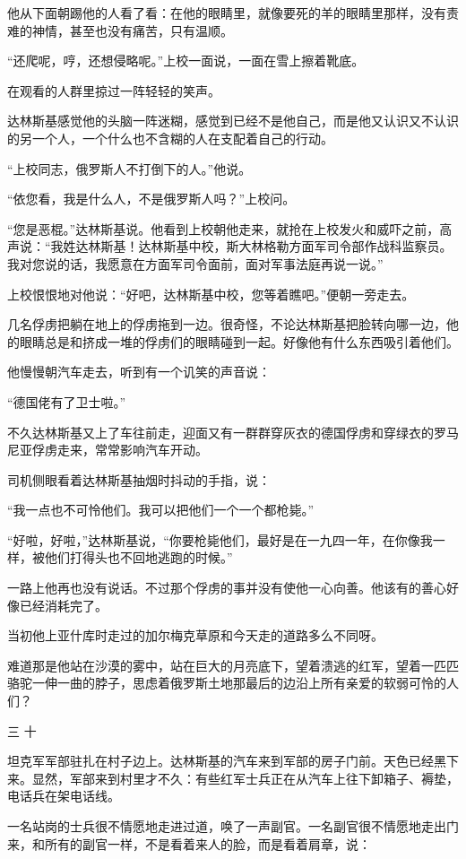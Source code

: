 他从下面朝踢他的人看了看：在他的眼睛里，就像要死的羊的眼睛里那样，没有责难的神情，甚至也没有痛苦，只有温顺。

“还爬呢，哼，还想侵略呢。”上校一面说，一面在雪上擦着靴底。

在观看的人群里掠过一阵轻轻的笑声。

达林斯基感觉他的头脑一阵迷糊，感觉到已经不是他自己，而是他又认识又不认识的另一个人，一个什么也不含糊的人在支配着自己的行动。

“上校同志，俄罗斯人不打倒下的人。”他说。

“依您看，我是什么人，不是俄罗斯人吗？”上校问。

“您是恶棍。”达林斯基说。他看到上校朝他走来，就抢在上校发火和威吓之前，高声说：“我姓达林斯基！达林斯基中校，斯大林格勒方面军司令部作战科监察员。我对您说的话，我愿意在方面军司令面前，面对军事法庭再说一说。”

上校恨恨地对他说：“好吧，达林斯基中校，您等着瞧吧。”便朝一旁走去。

几名俘虏把躺在地上的俘虏拖到一边。很奇怪，不论达林斯基把脸转向哪一边，他的眼睛总是和挤成一堆的俘虏们的眼睛碰到一起。好像他有什么东西吸引着他们。

他慢慢朝汽车走去，听到有一个讥笑的声音说：

“德国佬有了卫士啦。”

不久达林斯基又上了车往前走，迎面又有一群群穿灰衣的德国俘虏和穿绿衣的罗马尼亚俘虏走来，常常影响汽车开动。

司机侧眼看着达林斯基抽烟时抖动的手指，说：

“我一点也不可怜他们。我可以把他们一个一个都枪毙。”

“好啦，好啦，”达林斯基说，“你要枪毙他们，最好是在一九四一年，在你像我一样，被他们打得头也不回地逃跑的时候。”

一路上他再也没有说话。不过那个俘虏的事并没有使他一心向善。他该有的善心好像已经消耗完了。

当初他上亚什库时走过的加尔梅克草原和今天走的道路多么不同呀。

难道那是他站在沙漠的雾中，站在巨大的月亮底下，望着溃逃的红军，望着一匹匹骆驼一伸一曲的脖子，思虑着俄罗斯土地那最后的边沿上所有亲爱的软弱可怜的人们？

三 十

坦克军军部驻扎在村子边上。达林斯基的汽车来到军部的房子门前。天色已经黑下来。显然，军部来到村里才不久：有些红军士兵正在从汽车上往下卸箱子、褥垫，电话兵在架电话线。

一名站岗的士兵很不情愿地走进过道，唤了一声副官。一名副官很不情愿地走出门来，和所有的副官一样，不是看着来人的脸，而是看着肩章，说：

